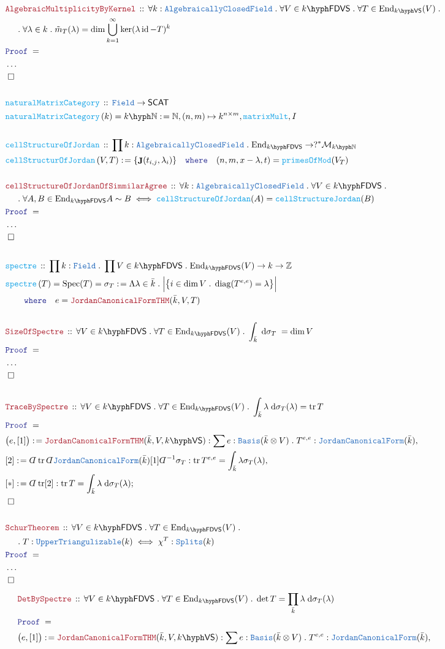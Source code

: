 \documentclass[12pt]{scrartcl}%
\newcommand{\TYPE}[1]{\textcolor{NavyBlue}{\mathtt{#1}}}%
\newcommand{\FUNC}[1]{\textcolor{Cerulean}{\mathtt{#1}}}%
\newcommand{\LOGIC}[1]{\textcolor{Blue}{\mathtt{#1}}}%
\newcommand{\THM}[1]{\textcolor{Maroon}{\mathtt{#1}}}%
\renewcommand{\.}{\; . \;} %
\newcommand{\de}{: \kern 0.1pc =} %
\newcommand{\where}{\LOGIC{where}} %
\newcommand{\Act}[1]{\left( #1 \right)} %
\newcommand{\Theorem}[2]{& \THM{#1} \, :: \, #2 \\ & \Proof = \\ } %
\newcommand{\DeclareFunc}[2]{& \FUNC{#1} \, :: \, #2 \\}%
\newcommand{\DefineFunc}[3]{&  \FUNC{#1}\Act{#2} \de #3 \\}%
\newcommand{\DefineNamedFunc}[4]{&  \FUNC{#1}\Act{#2} = #3 \de #4 \\}%
\newcommand{\NewLine}{\\ & \kern 1pc}%
\newcommand{\Page}[1]{ \begin{align*} #1 \end{align*}  }%
\newcommand{ \bd }{ \ByDef }%
\newcommand{\NoProof}{ & \ldots \\ \EndProof}%
\newcommand{\Int}{\mathbb{Z}}%
\newcommand{\Nat}{\mathbb{N}}%
\DeclareMathOperator*{\id}{id}%
\newcommand{\Mor}{\mathcal{M}}%
\newcommand{\End}{\mathrm{End}}%
\newcommand{\Say}[3]{& #1 \de #2 : #3, \\} %
\newcommand{\Conclude}[3]{& #1 \de #2 : #3; \\}%
\newcommand{\QED}{\; \square} %
\newcommand{\EndProof}{& \QED \\} %
\newcommand{\ByDef}{\rotatebox[origin=c]{-180}{$D$}}%
\newcommand{\Proof}{\LOGIC{Proof} \; } %
\newcommand{\JCF}{\TYPE{JordanCanonicalForm}}
\newcommand{\UT}{\TYPE{UpperTriangulizable}}
\DeclareMathOperator{\diag}{diag} %
\DeclareMathOperator{\tr}{tr}     %
\DeclareMathOperator{\JC}{\mathbf{J}}  %
\DeclareMathOperator{\Spec}{Spec} %
\newcommand{\VS}[1]{#1\hyph\mathsf{VS}} %
\newcommand{\FDVS}[1]{#1\hyph\mathsf{FDVS}} %
\newcommand{\NMAT}[1]{#1\hyph\mathbb{N}} %
\newcommand{\Field}{\TYPE{Field}}
\newcommand{\ACF}{\TYPE{AlgebraicallyClosedField}}
\begin{document}
\Page{
	\Theorem{AlgebraicMultiplicityByKernel}{
		\forall k : \ACF \. 
		\forall V \in \FDVS{k} \. 
		\forall T \in \End_{\VS{k}}(V) \. \NewLine \.
		\forall \lambda \in k \. 
		\tilde m_T(\lambda) =  \dim \bigcup^\infty_{k=1} \ker (  \lambda \id - T  )^k 
	}
	\NoProof
	\\
	\DeclareFunc{naturalMatrixCategory}{\Field \to \mathsf{SCAT}}
	\DefineNamedFunc{naturalMatrixCategory}{k}{\NMAT{k}}{\Nat,(n,m) \mapsto k^{n \times m},\FUNC{matrixMult},I}
	\\
	\DeclareFunc{cellStructureOfJordan}{ \prod k : \ACF \. \End_{\FDVS{k}} \to ?^*\Mor_{\NMAT{k}}  }
	\DefineFunc{cellStructurOfJordan}{V,T}{  \{ \JC(t_{i,j},\lambda_i) \} \quad \where \quad (n,m,x-\lambda,t) = \FUNC{primesOfMod}(V_T)}
	\\
	\Theorem{cellStructureOfJordanOfSimmilarAgree}{
		\forall k : \ACF \.  \forall V \in \FDVS{k} \. \NewLine \. \forall A,B \in \End_{\FDVS{k}}  
		A \sim B \iff \FUNC{cellStructureOfJordan}(A) = \FUNC{cellStructureJordan}(B)
	}
	\NoProof
	\\
	\DeclareFunc{spectre}{\prod k : \Field \. \prod V \in \FDVS{k} \. \End_{\FDVS{k}}(V) \to k \to \Int}
	\DefineNamedFunc{spectre}{T}{ \Spec(T) = \sigma_T }{  
		\Lambda \lambda \in \bar k \. 
		\Big|\big\{ i \in \dim V \.  \diag(T^{e,e}) = \lambda \big\}\Big|   \NewLine 
		\quad \where \quad e = \THM{JordanCanonicalFormTHM}(\bar k, V, T)                   
	}
	\\
	\Theorem{SizeOfSpectre}{\forall V \in \FDVS{k} \. \forall T \in \End_{\FDVS{k}}(V) \. \int_{\bar k} \; \mathrm{d}\sigma_T \; = \dim V}
	\NoProof
	\\
	\Theorem{TraceBySpectre}{\forall V \in \FDVS{k} \. \forall T \in \End_{\FDVS{k}}(V) \. \int_{\bar k} \lambda\;\mathrm{d}\sigma_T(\lambda) = \tr T}
	\Say{\big(e,[1]\big)}{\THM{JordanCanonicalFormTHM}(\bar k,V,\VS{k})}{\sum e : \TYPE{Basis}(\bar k \otimes V) \. T^{e,e} : \JCF(\bar k) }
	\Say{[2]}{ \bd \tr \bd \JCF(\bar k) [1]\bd^{-1} \sigma_T }{ \tr T^{e,e} = \int_{\bar k}  \lambda\sigma_T(\lambda)     }
	\Conclude{[*]}{\bd \tr [2] }{ \tr T = \int_{\bar k} \lambda \; \mathrm{d}\sigma_T(\lambda)  }
	\EndProof
	\\
	\Theorem{SchurTheorem}{\forall V \in \FDVS{k} \. \forall T \in \End_{\FDVS{k}}(V) \. 
		\NewLine \. T : \UT(k) \iff \chi^T : \TYPE{Splits}(k)}
	\NoProof
}\Page{
	\Theorem{DetBySpectre}{\forall V \in \FDVS{k} \. \forall T \in \End_{\FDVS{k}}(V) \. \det T = \prod_{\bar k}  \lambda \; \mathrm{d}\sigma_T(\lambda)} 
	\Say{\big(e,[1]\big)}{\THM{JordanCanonicalFormTHM}(\bar k,V,\VS{k})}{\sum e : \TYPE{Basis}(\bar k \otimes V) \. T^{e,e} : \JCF(\bar k) }
}
\end{document}
